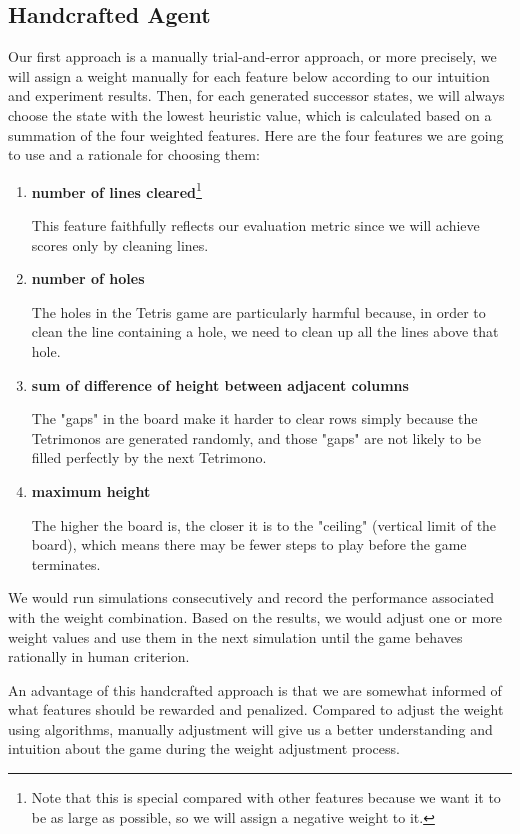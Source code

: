 \documentclass[letterpaper]{article} %
\begin{document}
\subsection{Handcrafted Agent}
Our first approach is a manually trial-and-error approach, or more precisely, we will assign a weight manually for each feature below according to our intuition and experiment results. Then, for each generated successor states, we will always choose the state with the lowest heuristic value, which is calculated based on a summation of the four weighted features. Here are the four features we are going to use and a rationale for choosing them:
\begin{enumerate}
 \item {\bf number of lines cleared}\footnote{Note that this is special compared with other features because we want it to be as large as possible, so we will assign a negative weight to it.}

This feature faithfully reflects our evaluation metric since we will achieve scores only by cleaning lines.

 \item {\bf number of holes}

The holes in the Tetris game are particularly harmful because, in order to clean the line containing a hole, we need to clean up all the lines above that hole. 

 \item {\bf sum of difference of height between adjacent columns}

The "gaps" in the board make it harder to clear rows simply because the Tetrimonos are generated randomly, and those "gaps" are not likely to be filled perfectly by the next Tetrimono.

 \item {\bf maximum height}

The higher the board is, the closer it is to the "ceiling" (vertical limit of the board), which means there may be fewer steps to play before the game terminates.

\end{enumerate}

We would run simulations consecutively and record the performance associated with the weight combination. Based on the results, we would adjust one or more weight values and use them in the next simulation until the game behaves rationally in human criterion.

An advantage of this handcrafted approach is that we are somewhat informed of what features should be rewarded and penalized. Compared to adjust the weight using algorithms, manually adjustment will give us a better understanding and intuition about the game during the weight adjustment process.
\end{document}
